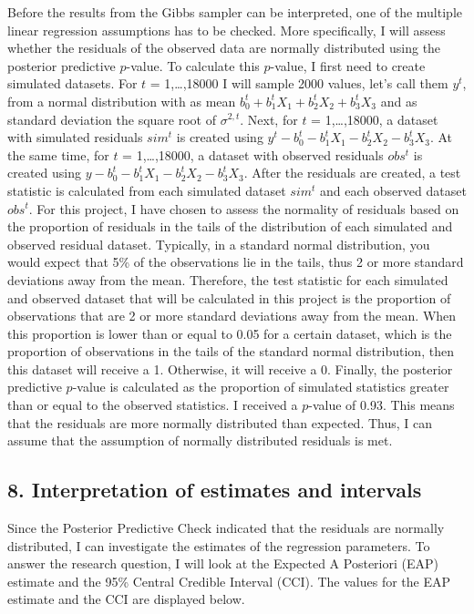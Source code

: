 \documentclass[
]{article}
\begin{document}
Before the results from the Gibbs sampler can be interpreted, one of the
multiple linear regression assumptions has to be checked. More
specifically, I will assess whether the residuals of the observed data
are normally distributed using the posterior predictive \(p\)-value. To
calculate this \(p\)-value, I first need to create simulated datasets.
For \(t\) = 1,\ldots,18000 I will sample 2000 values, let's call them
\(y^t\), from a normal distribution with as mean
\(b_{0}^t + b_{1}^tX_1 + b_{2}^tX_2 + b_{3}^tX_3\) and as standard
deviation the square root of \(\sigma^{2,t}\). Next, for \(t\) =
1,\ldots,18000, a dataset with simulated residuals \(sim^t\) is created
using \(y^t - b_{0}^t - b_{1}^tX_1 - b_{2}^tX_2 - b_{3}^tX_3\). At the
same time, for \(t\) = 1,\ldots,18000, a dataset with observed residuals
\(obs^t\) is created using
\(y - b_{0}^t - b_{1}^tX_1 - b_{2}^tX_2 - b_{3}^tX_3\). After the
residuals are created, a test statistic is calculated from each
simulated dataset \(sim^t\) and each observed dataset \(obs^t\). For
this project, I have chosen to assess the normality of residuals based
on the proportion of residuals in the tails of the distribution of each
simulated and observed residual dataset. Typically, in a standard normal
distribution, you would expect that 5\% of the observations lie in the
tails, thus 2 or more standard deviations away from the mean. Therefore,
the test statistic for each simulated and observed dataset that will be
calculated in this project is the proportion of observations that are 2
or more standard deviations away from the mean. When this proportion is
lower than or equal to 0.05 for a certain dataset, which is the
proportion of observations in the tails of the standard normal
distribution, then this dataset will receive a 1. Otherwise, it will
receive a 0. Finally, the posterior predictive \(p\)-value is calculated
as the proportion of simulated statistics greater than or equal to the
observed statistics. I received a \(p\)-value of 0.93. This means that
the residuals are more normally distributed than expected. Thus, I can
assume that the assumption of normally distributed residuals is met.

\hypertarget{interpretation-of-estimates-and-intervals}{%
\subsection{8. Interpretation of estimates and
intervals}\label{interpretation-of-estimates-and-intervals}}

Since the Posterior Predictive Check indicated that the residuals are
normally distributed, I can investigate the estimates of the regression
parameters. To answer the research question, I will look at the Expected
A Posteriori (EAP) estimate and the 95\% Central Credible Interval
(CCI). The values for the EAP estimate and the CCI are displayed below.
\end{document}
